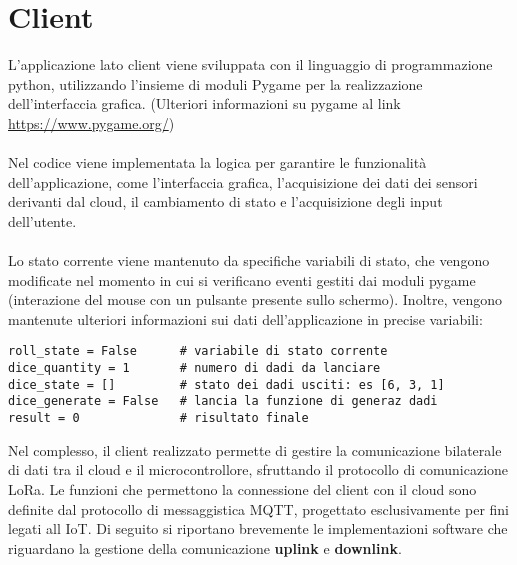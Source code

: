 \section{Client}
L'applicazione lato client viene sviluppata con il linguaggio di programmazione python, utilizzando l'insieme di moduli Pygame 
per la realizzazione dell'interfaccia grafica. (Ulteriori informazioni su pygame al link \href{https://www.pygame.org/}{https://www.pygame.org/})
\\\\Nel codice viene implementata la logica per garantire le funzionalità dell'applicazione, come l'interfaccia grafica, l'acquisizione 
dei dati dei sensori derivanti dal cloud, il cambiamento di stato e l'acquisizione degli input dell'utente.\\\\
Lo stato corrente viene mantenuto da specifiche variabili di stato, che vengono modificate nel momento in cui si verificano eventi gestiti dai moduli pygame
(interazione del mouse con un pulsante presente sullo schermo). Inoltre, vengono mantenute ulteriori informazioni sui dati dell'applicazione in precise variabili:
\begin{verbatim}
roll_state = False      # variabile di stato corrente
dice_quantity = 1       # numero di dadi da lanciare
dice_state = []         # stato dei dadi usciti: es [6, 3, 1]
dice_generate = False   # lancia la funzione di generaz dadi
result = 0              # risultato finale
\end{verbatim}
Nel complesso, il client realizzato permette di gestire la comunicazione bilaterale di dati tra il cloud e il microcontrollore, sfruttando
il protocollo di comunicazione LoRa. Le funzioni che permettono la connessione del client con il cloud sono definite dal protocollo 
di messaggistica MQTT, progettato esclusivamente per fini legati all IoT.
Di seguito si riportano brevemente le implementazioni software che riguardano la gestione della comunicazione
\textbf{uplink} e \textbf{downlink}.


